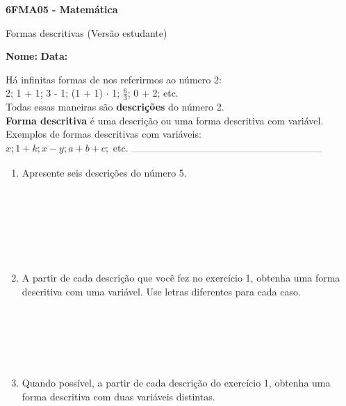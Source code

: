 \documentclass[a4paper,14pt]{article}
\begin{document}
	
	\noindent\textbf{6FMA05 - Matemática} 
	
	\begin{center}Formas descritivas (Versão estudante)
	\end{center}
	
	\noindent\textbf{Nome:} \underline{\hspace{10cm}}
	\noindent\textbf{Data:} \underline{\hspace{4cm}}
	
	
	\begin{multicols}{2}
		\noindent Há infinitas formas de nos referirmos ao número 2: \\
		2; 1 + 1; 3 - 1; (1 + 1) $\cdot$ 1; $\frac{6}{3}$; 0 + 2; etc. \\
		Todas essas maneiras são \textbf{descrições} do número 2. \\
		\textbf{Forma descritiva} é uma descrição ou uma forma descritiva com variável. \\
		Exemplos de formas descritivas com variáveis: \\
		$x; 1 + k; x - y; a + b + c;$ etc.
		\noindent\textsubscript{-----------------------------------------------------------------------}
		\begin{enumerate}
			\item Apresente seis descrições do número 5. \\\\\\\\\\\\\\
			\item A partir de cada descrição que você fez no exercício 1, obtenha uma forma descritiva com uma variável. Use letras diferentes para cada caso. \\\\\\\\\\\\
			\item Quando possível, a partir de cada descrição do exercício 1, obtenha uma forma descritiva com duas variáveis distintas. \\\\\\\\\\\\\\\\\\\

\end{enumerate}
\end{multicols}
\end{document}
